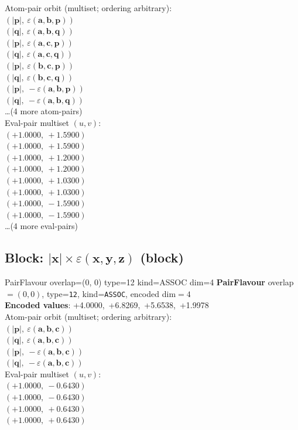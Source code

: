 \documentclass[a4paper,11pt]{article}
\newcommand{\vc}[1]{\ensuremath{\mathbf{#1}}}
\newcommand{\dnfagmiihhiejm}[1]{|\vc{#1}|}
\newcommand{\kblbmcpggoncpf}[3]{\varepsilon(\mathbf{#1},\mathbf{#2},\mathbf{#3})}
\begin{document}
\quad Atom-pair orbit (multiset; ordering arbitrary):\\
$(\dnfagmiihhiejm{p},\ \kblbmcpggoncpf{a}{b}{p})$\\
$(\dnfagmiihhiejm{q},\ \kblbmcpggoncpf{a}{b}{q})$\\
$(\dnfagmiihhiejm{p},\ \kblbmcpggoncpf{a}{c}{p})$\\
$(\dnfagmiihhiejm{q},\ \kblbmcpggoncpf{a}{c}{q})$\\
$(\dnfagmiihhiejm{p},\ \kblbmcpggoncpf{b}{c}{p})$\\
$(\dnfagmiihhiejm{q},\ \kblbmcpggoncpf{b}{c}{q})$\\
$(\dnfagmiihhiejm{p},\ -\kblbmcpggoncpf{a}{b}{p})$\\
$(\dnfagmiihhiejm{q},\ -\kblbmcpggoncpf{a}{b}{q})$\\
\quad \ldots (4 more atom-pairs)\\
\quad Eval-pair multiset $(u, v)$:\\
$(+1.0000,\ +1.5900)$\\
$(+1.0000,\ +1.5900)$\\
$(+1.0000,\ +1.2000)$\\
$(+1.0000,\ +1.2000)$\\
$(+1.0000,\ +1.0300)$\\
$(+1.0000,\ +1.0300)$\\
$(+1.0000,\ -1.5900)$\\
$(+1.0000,\ -1.5900)$\\
\quad \ldots (4 more eval-pairs)\\

\subsection{Block: $\dnfagmiihhiejm{x} \times \kblbmcpggoncpf{x}{y}{z}$  (block)}
    PairFlavour  overlap=(0, 0)  type=12  kind=ASSOC  dim=4
\textbf{PairFlavour} overlap$=(0, 0)$, type=\texttt{12}, kind=\texttt{ASSOC}, encoded dim$=4$\\
\textbf{      Encoded values}: +4.0000,\ +6.8269,\ +5.6538,\ +1.9978\\
\quad Atom-pair orbit (multiset; ordering arbitrary):\\
$(\dnfagmiihhiejm{p},\ \kblbmcpggoncpf{a}{b}{c})$\\
$(\dnfagmiihhiejm{q},\ \kblbmcpggoncpf{a}{b}{c})$\\
$(\dnfagmiihhiejm{p},\ -\kblbmcpggoncpf{a}{b}{c})$\\
$(\dnfagmiihhiejm{q},\ -\kblbmcpggoncpf{a}{b}{c})$\\
\quad Eval-pair multiset $(u, v)$:\\
$(+1.0000,\ -0.6430)$\\
$(+1.0000,\ -0.6430)$\\
$(+1.0000,\ +0.6430)$\\
$(+1.0000,\ +0.6430)$\\
\end{document}
